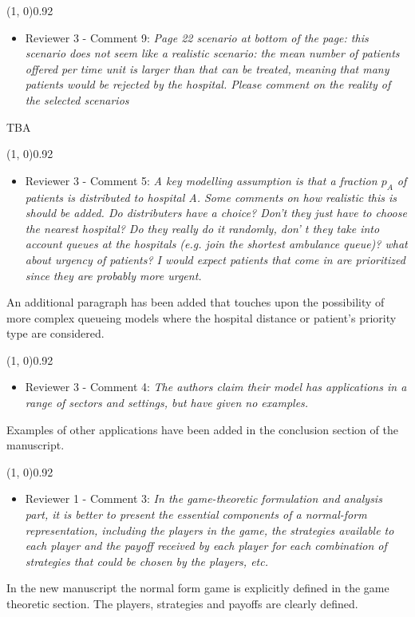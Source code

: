 \documentclass{article}
\begin{document}
    \line(1, 0){0.92\textwidth}
    \begin{itemize}
        \item Reviewer 3 - Comment 9: \textit{Page 22 scenario at bottom of
        the page: this scenario does not seem like a realistic scenario:
        the mean number of patients offered per time unit is larger than
        that can be treated, meaning that many patients would be rejected
        by the hospital. Please comment on the reality of the selected
        scenarios}
    \end{itemize}
    TBA %

    \line(1, 0){0.92\textwidth}
    \begin{itemize}
        \item Reviewer 3 - Comment 5: \textit{A key modelling assumption is
        that a fraction \(p_A\) of patients is distributed to hospital A.
        Some comments on how realistic this is should be added. Do
        distributers have a choice? Don't they just have to choose the
        nearest hospital? Do they really do it randomly, don' t they take
        into account queues at the hospitals (e.g. join the shortest
        ambulance queue)? what about urgency of patients? I would expect
        patients that come in are prioritized since they are probably more
        urgent.}
    \end{itemize}
    An additional paragraph has been added that touches upon the possibility of
    more complex queueing models where the hospital distance or patient's
    priority type are considered.

    \line(1, 0){0.92\textwidth}
    \begin{itemize}
        \item Reviewer 3 - Comment 4: \textit{The authors claim their model
        has applications in a range of sectors and settings, but have given
        no examples.}
    \end{itemize}
    Examples of other applications have been added in the conclusion section
    of the manuscript.

    \line(1, 0){0.92\textwidth}
    \begin{itemize}
        \item Reviewer 1 - Comment 3: \textit{In the game-theoretic
        formulation and analysis part, it is better to present the
        essential components of a normal-form representation, including the
        players in the game, the strategies available to each player and the
        payoff received by each player for each combination of strategies
        that could be chosen by the players, etc.}
    \end{itemize}
    In the new manuscript the normal form game is explicitly defined in the
    game theoretic section. The players, strategies and payoffs are clearly
    defined. 
\end{document}
